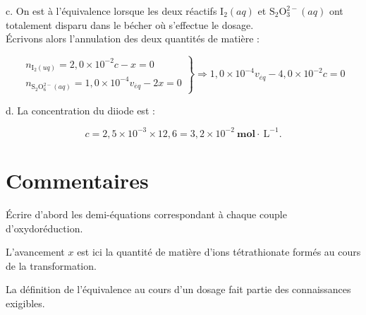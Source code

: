 c. On est à l'équivalence lorsque les deux réactifs $\mathrm{I}_{2}(a q)$ et $\mathrm{S}_{2} \mathrm{O}_{3}^{2-}(a q)$ ont totalement disparu dans le bécher où s'effectue le dosage.\\
Écrivons alors l'annulation des deux quantités de matière :

$$
\left.\begin{array}{l}
n_{\mathrm{I}_{2}(u q)}=2,0 \times 10^{-2} c-x=0 \\
n_{\mathrm{S}_{2} \mathrm{O}_{6}^{2-}(a q)}=1,0 \times 10^{-4} v_{\dot{e q}}-2 x=0
\end{array}\right\} \Rightarrow 1,0 \times 10^{-4} v_{\dot{e q}}-4,0 \times 10^{-2} c=0
$$

d. La concentration du diiode est :

$$
c=2,5 \times 10^{-3} \times 12,6=3,2 \times 10^{-2} \mathbf{~ m o l} \cdot \mathrm{~L}^{-1} .
$$

\section*{Commentaires}
Écrire d'abord les demi-équations correspondant à chaque couple d'oxydoréduction.

L'avancement $x$ est ici la quantité de matière d'ions tétrathionate formés au cours de la transformation.

La définition de l'équivalence au cours d'un dosage fait partie des connaissances exigibles.



